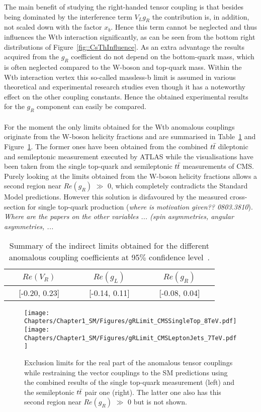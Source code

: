 The main benefit of studying the right-handed tensor coupling is that besides being dominated by the interference term $V_L g_R$ the contribution is, in addition, not scaled down with the factor $x_b$.
Hence this term cannot be neglected and thus influences the Wtb interaction significantly, as can be seen from the bottom right distributions of Figure~\ref{fig::CsThInfluence}.
As an extra advantage the results acquired from the $g_R$ coefficient do not depend on the bottom-quark mass, which is often neglected compared to the W-boson and top-quark mass. Within the Wtb interaction vertex this so-called massless-b limit is assumed in various theoretical and experimental research studies even though it has a noteworthy effect on the other coupling constants. Hence the obtained experimental results for the $g_R$ component can easily be compared.
\\
\\
For the moment the only limits obtained for the Wtb anomalous couplings originate from the W-boson helicity fractions and are summarised in Table~\ref{table::AnomCoupResults} and Figure~\ref{fig::WtbResults}.
The former ones have been obtained from the combined $t\bar{t}$ dileptonic and semileptonic measurement executed by ATLAS while the visualisations have been taken from the single top-quark and semileptonic $t\bar{t}$ measurements of CMS. Purely looking at the limits obtained from the W-boson helicity fractions allows a second region near $Re(g_R)$ $\gg$ $0$, which completely contradicts the Standard Model predictions. However this solution is disfavoured by the measured cross-section for single top-quark production (\textit{where is motivation given?? 0803.3810}).
\textit{Where are the papers on the other variables ... (spin asymmetries, angular asymmetries, ...}

\begin{table}[h!t]
 \caption{Summary of the indirect limits obtained for the different anomalous coupling coefficients at 95$\%$ confidence level~\cite{AtlasWtbLimits}.} \label{table::AnomCoupResults}
 \centering
 \begin{tabular}{c|c|c}
  $Re(V_R)$ 		& $Re(g_L)$ 		& $Re(g_R)$ 		\\
  \hline
  ~~ [-0.20, 0.23] ~~	& ~~ [-0.14, 0.11] ~~	& ~~ [-0.08, 0.04] ~~	\\
 \end{tabular}
\end{table}

\begin{figure}[h!t]
 \centering
 \texttt{[image: Chapters/Chapter1\_SM/Figures/gRLimit\_CMSSingleTop\_8TeV.pdf]}
 \texttt{[image: Chapters/Chapter1\_SM/Figures/gRLimit\_CMSLeptonJets\_7TeV.pdf]}
 \caption{Exclusion limits for the real part of the anomalous tensor couplings while restraining the vector couplings to the SM predictions using the combined results of the single top-quark measurement (left) and the semileptonic $t\bar{t}$ pair one (right). The latter one also has this second region near $Re(g_R)$ $\gg$ $0$ but is not shown.} \label{fig::WtbResults}
\end{figure}

